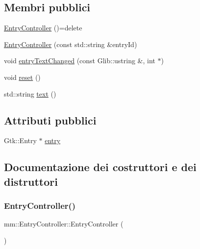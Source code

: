 \subsection*{Membri pubblici}
\begin{DoxyCompactItemize}
\item 
\mbox{\hyperlink{structmm_1_1_entry_controller_a8669618dd4526580cdb3cd88f9d16e52}{Entry\+Controller}} ()=delete
\item 
\mbox{\hyperlink{structmm_1_1_entry_controller_a8c99741ce10e997c35b397cef397fa6d}{Entry\+Controller}} (const std\+::string \&entry\+Id)
\item 
void \mbox{\hyperlink{structmm_1_1_entry_controller_ad4d3a1e3dc08262fe244e8c9bc0a455c}{entry\+Text\+Changed}} (const Glib\+::ustring \&, int $\ast$)
\item 
void \mbox{\hyperlink{structmm_1_1_entry_controller_a8eb56a968a567d1641c47d0f08b23f6f}{reset}} ()
\item 
std\+::string \mbox{\hyperlink{structmm_1_1_entry_controller_a8665e8b7d74b0f8c807d5b3ad418e535}{text}} ()
\end{DoxyCompactItemize}
\subsection*{Attributi pubblici}
\begin{DoxyCompactItemize}
\item 
Gtk\+::\+Entry $\ast$ \mbox{\hyperlink{structmm_1_1_entry_controller_ab41f377d1a98b2bf967c81dc1dc7f391}{entry}}
\end{DoxyCompactItemize}


\subsection{Documentazione dei costruttori e dei distruttori}
\mbox{\label{structmm_1_1_entry_controller_a8669618dd4526580cdb3cd88f9d16e52}} 
\subsubsection{\texorpdfstring{Entry\+Controller()}{EntryController()}\hspace{0.1cm}{\footnotesize\ttfamily [1/2]}}
{\footnotesize\ttfamily mm\+::\+Entry\+Controller\+::\+Entry\+Controller (\begin{DoxyParamCaption}{ }\end{DoxyParamCaption})\hspace{0.3cm}{\ttfamily [delete]}}

